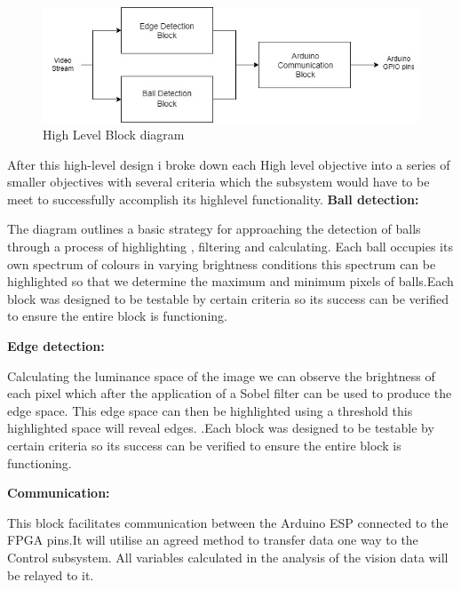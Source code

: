 \documentclass[10pt,twoside]{article}
\begin{document}
\begin{figure}[hbt!]
    \centering
    \includegraphics[scale=0.35]{HighLevelDesign.jpg}
    \captionsetup{justification=centering}
    \caption{High Level Block diagram}
\end{figure}

\smallbreak
After this high-level design i broke down each High level objective into a series of smaller objectives with several criteria which the subsystem would have to be meet to successfully accomplish its highlevel functionality. 
\smallbreak
\textbf{Ball detection:}

The diagram outlines a basic strategy for approaching the detection of balls through a process of highlighting , filtering and calculating. Each  ball occupies its own spectrum of colours in varying brightness conditions this spectrum can be highlighted so that we determine the maximum and minimum pixels of balls.Each block was designed to be testable by certain criteria so its success can be verified to ensure the entire block is functioning. 

\textbf{Edge detection:}

Calculating the luminance space of the image we can observe the brightness of each pixel which after the
application of a Sobel filter can be used to produce the edge space. This edge space can then be highlighted
using a threshold this highlighted space will reveal edges. .Each block was designed to be testable by certain
criteria so its success can be verified to ensure the entire block is functioning.

\textbf{Communication:}

This block facilitates communication between the Arduino ESP connected to the FPGA pins.It will utilise an agreed method to transfer data one way to the Control subsystem. All variables calculated in the analysis of the vision data will be relayed to it.
\end{document}
